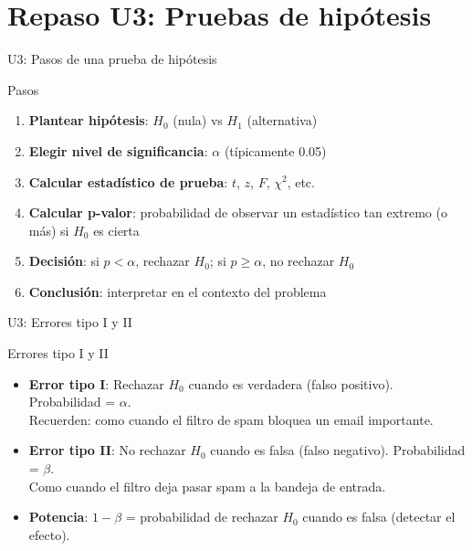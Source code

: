 \documentclass[aspectratio=169, 11pt]{beamer}
\begin{document}
\section{Repaso U3: Pruebas de hipótesis}

\begin{frame}{U3: Pasos de una prueba de hipótesis}
\begin{block}{Pasos}
\begin{enumerate}
\item \textbf{Plantear hipótesis}: $H_0$ (nula) vs $H_1$ (alternativa)
\item \textbf{Elegir nivel de significancia}: $\alpha$ (típicamente 0.05)
\item \textbf{Calcular estadístico de prueba}: $t$, $z$, $F$, $\chi^2$, etc.
\item \textbf{Calcular p-valor}: probabilidad de observar un estadístico tan extremo (o más) si $H_0$ es cierta
\item \textbf{Decisión}: si $p < \alpha$, rechazar $H_0$; si $p \geq \alpha$, no rechazar $H_0$
\item \textbf{Conclusión}: interpretar en el contexto del problema
\end{enumerate}
\end{block}
\end{frame}

\begin{frame}{U3: Errores tipo I y II}
\begin{block}{Errores tipo I y II}
\begin{itemize}
\item \textbf{Error tipo I}: Rechazar $H_0$ cuando es verdadera (falso positivo). Probabilidad = $\alpha$. \\ \small Recuerden: como cuando el filtro de spam bloquea un email importante.
\item \textbf{Error tipo II}: No rechazar $H_0$ cuando es falsa (falso negativo). Probabilidad = $\beta$. \\ \small Como cuando el filtro deja pasar spam a la bandeja de entrada.
\item \textbf{Potencia}: $1 - \beta$ = probabilidad de rechazar $H_0$ cuando es falsa (detectar el efecto).
\end{itemize}
\end{block}
\end{frame}
\end{document}
